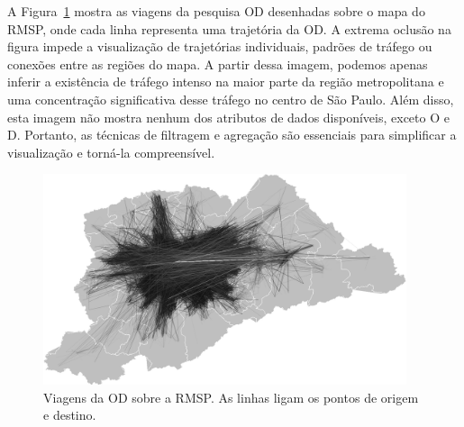 A Figura~\ref{fig:cluttered-graph} mostra as viagens da pesquisa OD desenhadas sobre o mapa do
RMSP, onde cada linha representa uma trajetória da OD. A extrema oclusão na figura
impede a visualização de trajetórias individuais, padrões de tráfego ou conexões
entre as regiões do mapa. A partir dessa imagem, podemos apenas inferir a
existência de tráfego intenso na maior parte da região metropolitana e uma
concentração significativa desse tráfego no centro de São Paulo. Além disso,
esta imagem não mostra nenhum dos atributos de dados disponíveis, exceto O e D.
Portanto, as técnicas de filtragem e agregação são essenciais para simplificar a
visualização e torná-la compreensível.

\begin{figure}[!htb]
  \centering
  \captionsetup{justification=centering}
  \includegraphics[width=0.95\textwidth]{figuras/unbundled-edges+grayscale+512px.png}
  \caption{Viagens da OD sobre a RMSP. As linhas ligam os pontos de origem e destino. \label{fig:cluttered-graph}}
\end{figure}
